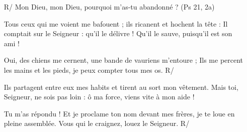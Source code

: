 \begin{itemize}
\item[R/]
Mon Dieu, mon Dieu,
pourquoi m’as-tu abandonné ? (Ps 21, 2a)
\item[]
Tous ceux qui me voient me bafouent ;
ils ricanent et hochent la tête :
\og Il comptait sur le Seigneur : qu’il le délivre !
Qu’il le sauve, puisqu’il est son ami ! \fg
\item[]
Oui, des chiens me cernent,
une bande de vauriens m’entoure ;
Ils me percent les mains et les pieds,
je peux compter tous mes os. R/
\item[]
Ils partagent entre eux mes habits
et tirent au sort mon vêtement.
Mais toi, Seigneur, ne sois pas loin :
ô ma force, viens vite à mon aide !
\item[]
Tu m’as répondu !
Et je proclame ton nom devant mes frères,
je te loue en pleine assemblée.
Vous qui le craignez, louez le Seigneur. R/
\end{itemize}
